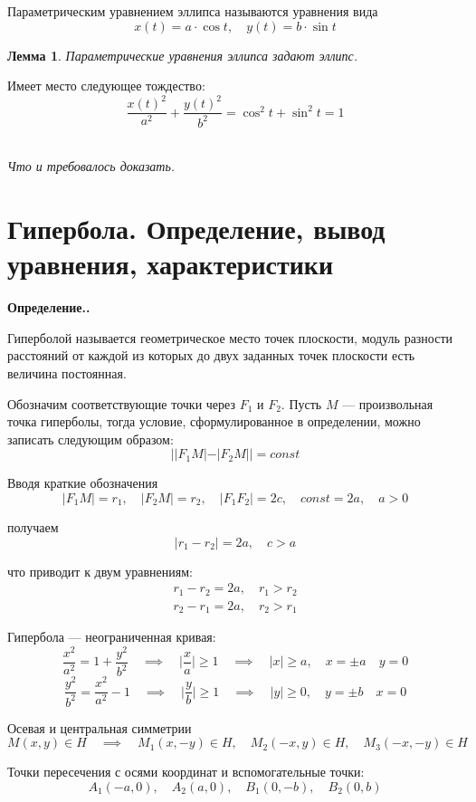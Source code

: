 \documentclass[a4paper,12pt,oneside]{extbook}
\newcommand{\newpar}{$ $\par\nobreak\ignorespaces}
\newenvironment{definition}[1][]{\noindent\textbf{Определение.\if\relax\detokenize{#1}\relax\else\;#1.\fi}\newpar}{\bigskip}
\theoremstyle{numbered}
\theoremstyle{unnumbered}
\theoremstyle{named}
\theoremstyle{unnumbered}
\theoremstyle{named}
\newtheorem{lemma}{Лемма}[section]
\theoremstyle{named}
\theoremstyle{named}
\renewenvironment{proof}[1][]{\breakenv[Доказательство]{\if\relax\detokenize{#1}\relax\else\;\fi}{\textbf{#1}}}{\smallskip\newpar \hfill\textit{Что и требовалось доказать.}}
\begin{document}
\begin{siderules}
    Параметрическим уравнением эллипса называются уравнения вида
    \[
        x(t) = a \cdot \cos{t}, \quad y(t) = b \cdot \sin{t}
    \]
\end{siderules}

\begin{lemma}
    Параметрические уравнения эллипса задают эллипс.
\end{lemma}

\begin{proof}
    Имеет место следующее тождество:
    \[
        \frac{{x(t)}^2}{a^2} + \frac{{y(t)}^2}{b^2} = \cos^2{t} + \sin^2{t} = 1
    \]
\end{proof}

\section{Гипербола. Определение, вывод уравнения, характеристики}%
\label{sec:Гипербола. Определение, вывод уравнения, характеристики}

\begin{definition}
    Гиперболой называется геометрическое место точек плоскости, модуль разности расстояний от каждой из которых до двух заданных точек плоскости есть величина постоянная.

    Обозначим соответствующие точки через \(F_1\) и \(F_2\).
    Пусть \(M\) — произвольная точка гиперболы, тогда условие, сформулированное в определении, можно записать следующим образом:
    \[
        ||F_1 M| - |F_2 M|| = const
    \]

    Вводя краткие обозначения
    \[
        |F_1 M| = r_1, \quad |F_2 M| = r_2, \quad |F_1 F_2| = 2c, \quad const = 2a, \quad a > 0
    \]

    получаем
    \[
        |r_1 - r_2| = 2a, \quad c > a
    \]

    что приводит к двум уравнениям:
    \begin{gather*}
        r_1 - r_2 = 2a, \quad r_1 > r_2 \\
        r_2 - r_1 = 2a, \quad r_2 > r_1
    \end{gather*}

    Гипербола — неограниченная кривая:
    \[
        \frac{x^2}{a^2} = 1 + \frac{y^2}{b^2} \quad \implies \quad \Big|\frac{x}{a}\Big| \geq 1 \quad \implies \quad |x| \geq a, \quad x = \pm a \quad y = 0
    \]
    \[
        \frac{y^2}{b^2} = \frac{x^2}{a^2} - 1 \quad \implies \quad \Big|\frac{y}{b}\Big| \geq 1 \quad \implies \quad |y| \geq 0, \quad y = \pm b \quad x = 0
    \]

    Осевая и центральная симметрии
    \[
        M(x, y) \in H \quad \implies \quad M_1 (x, -y) \in H, \quad M_2 (-x, y) \in H, \quad M_3 (-x, -y) \in H
    \]

    Точки пересечения с осями координат и вспомогательные точки:
    \[
        A_1 (-a, 0), \quad A_2 (a, 0), \quad B_1 (0, -b), \quad B_2 (0, b)
    \]
\end{definition}
\end{document}
